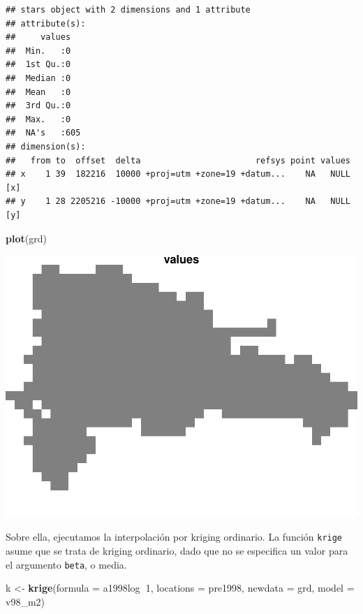 \documentclass[11pt,]{article}
\newenvironment{Shaded}{\begin{snugshade}}{\end{snugshade}}
\newcommand{\KeywordTok}[1]{\textcolor[rgb]{0.13,0.29,0.53}{\textbf{#1}}}
\newcommand{\DataTypeTok}[1]{\textcolor[rgb]{0.13,0.29,0.53}{#1}}
\newcommand{\DecValTok}[1]{\textcolor[rgb]{0.00,0.00,0.81}{#1}}
\newcommand{\StringTok}[1]{\textcolor[rgb]{0.31,0.60,0.02}{#1}}
\newcommand{\OperatorTok}[1]{\textcolor[rgb]{0.81,0.36,0.00}{\textbf{#1}}}
\newcommand{\NormalTok}[1]{#1}
\begin{document}
\begin{verbatim}
## stars object with 2 dimensions and 1 attribute
## attribute(s):
##     values    
##  Min.   :0    
##  1st Qu.:0    
##  Median :0    
##  Mean   :0    
##  3rd Qu.:0    
##  Max.   :0    
##  NA's   :605  
## dimension(s):
##   from to  offset  delta                       refsys point values    
## x    1 39  182216  10000 +proj=utm +zone=19 +datum...    NA   NULL [x]
## y    1 28 2205216 -10000 +proj=utm +zone=19 +datum...    NA   NULL [y]
\end{verbatim}

\begin{Shaded}
\begin{Highlighting}[]
\KeywordTok{plot}\NormalTok{(grd)}
\end{Highlighting}
\end{Shaded}

\includegraphics[width=800px]{proyecto_files/figure-latex/grd-1}

Sobre ella, ejecutamos la interpolación por kriging ordinario. La
función \texttt{krige} asume que se trata de kriging ordinario, dado que
no se especifica un valor para el argumento \texttt{beta}, o media.

\begin{Shaded}
\begin{Highlighting}[]
\NormalTok{k <-}\StringTok{ }\KeywordTok{krige}\NormalTok{(}\DataTypeTok{formula =}\NormalTok{ a1998log}\OperatorTok{~}\DecValTok{1}\NormalTok{, }\DataTypeTok{locations =}\NormalTok{ pre1998, }\DataTypeTok{newdata =}\NormalTok{ grd, }\DataTypeTok{model =}\NormalTok{ v98_m2)}
\end{Highlighting}
\end{Shaded}
\end{document}
